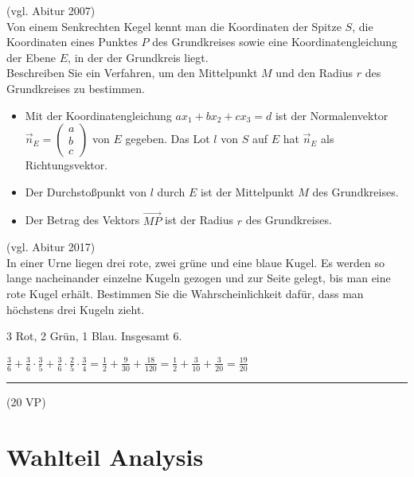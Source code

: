  (vgl. Abitur 2007)\\
Von einem Senkrechten Kegel kennt man die Koordinaten der Spitze $S$, die Koordinaten eines Punktes $P$ des Grundkreises sowie eine Koordinatengleichung der Ebene $E$, in der der Grundkreis liegt.
\\Beschreiben Sie ein Verfahren, um den Mittelpunkt $M$ und den Radius $r$ des Grundkreises zu bestimmen.

\begin{lsg}{}
\begin{itemize}
  \item Mit der Koordinatengleichung $ax_1+bx_2+cx_3=d$ ist der Normalenvektor $\vec n_E=\left(\begin{array}{c}a\\b\\c\end{array}\right)$ von $E$ gegeben.
  Das Lot $l$ von $S$ auf $E$ hat $\vec n_E$ als Richtungsvektor.
  \item Der Durchstoßpunkt von $l$ durch $E$ ist der Mittelpunkt $M$ des Grundkreises.
  \item Der Betrag des Vektors $\overrightarrow{MP}$ ist der Radius $r$ des Grundkreises.
\end{itemize}
\end{lsg}

 (vgl. Abitur 2017)\\
In einer Urne liegen drei rote, zwei grüne und eine blaue Kugel. Es werden so lange nacheinander einzelne Kugeln gezogen und zur Seite gelegt, bis man eine rote Kugel erhält. Bestimmen Sie die Wahrscheinlichkeit dafür, dass man höchstens drei Kugeln zieht. 
\begin{lsg}{}
3 Rot, 2 Grün, 1 Blau. Insgesamt 6.

$\frac 3 6 + \frac 3 6 \cdot\frac 3 5 + \frac 3 6 \cdot \frac 2 5 \cdot \frac 3 4 = \frac 1 2+\frac{9}{30} +\frac{18}{120}=\frac 1 2 + \frac{3}{10}+  \frac{3}{20} = \frac{19}{20}$
\end{lsg}

\vfill

\hfill\rule{1.5cm}{0.4mm}

\hfill (20 VP)\hspace{0.22cm}







\section{Wahlteil Analysis}

